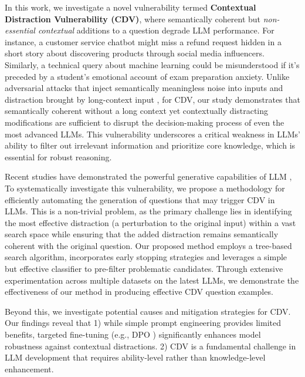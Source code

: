 In this work, we investigate a novel vulnerability termed \textbf{Contextual Distraction Vulnerability (CDV)}, where semantically coherent but \textit{non-essential contextual} additions to a question degrade LLM performance. For instance, a customer service chatbot might miss a refund request hidden in a short story about discovering products through social media influencers. Similarly, a technical query about machine learning could be misunderstood if it's preceded by a student's emotional account of exam preparation anxiety. 
Unlike adversarial attacks that inject semantically meaningless noise into inputs \citep{zou2023universal, 10.1145/3658644.3690291} and distraction brought by long-context input \citep{bai2023longbench}, for CDV, our study demonstrates that semantically coherent without a long context yet contextually distracting modifications are sufficient to disrupt the decision-making process of even the most advanced LLMs. This vulnerability underscores a critical weakness in LLMs' ability to filter out irrelevant information and prioritize core knowledge, which is essential for robust reasoning.

Recent studies have demonstrated the powerful generative capabilities of LLM \cite{xu2024magpie, wu2024unigen}, To systematically investigate this vulnerability, we propose a methodology for efficiently automating the generation of questions that may trigger CDV in LLMs. This is a non-trivial problem, as the primary challenge lies in identifying the most effective distraction (a perturbation to the original input) within a vast search space while ensuring that the added distraction remains semantically coherent with the original question. Our proposed method employs a tree-based search algorithm, 
incorporates early stopping strategies and leverages a simple but effective classifier to pre-filter problematic candidates. Through extensive experimentation across multiple datasets on the latest LLMs, we demonstrate the effectiveness of our method in producing effective  CDV question examples.


Beyond this, we investigate potential causes and mitigation strategies for CDV. Our findings reveal that 1) while simple prompt engineering provides limited benefits, targeted fine-tuning (e.g., DPO \citep{rafailov2024direct})  significantly enhances model robustness against contextual distractions. 2) CDV is a fundamental challenge in LLM development that requires ability-level  rather than knowledge-level enhancement.

